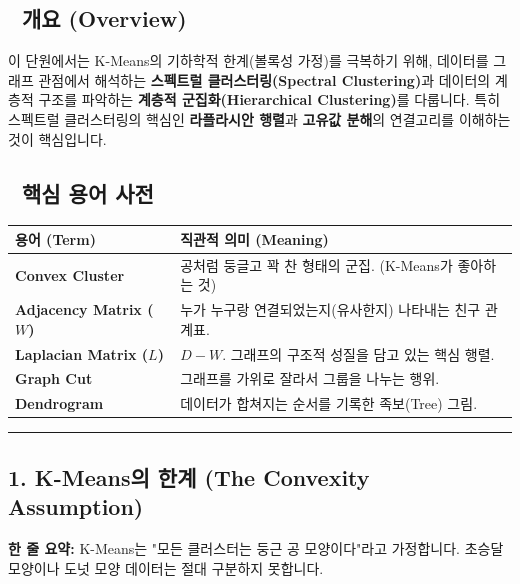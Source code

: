 \documentclass[11pt,a4paper]{book}
\theoremstyle{definition}
\begin{document}
\subsection*{📌 개요 (Overview)}
이 단원에서는 K-Means의 기하학적 한계(볼록성 가정)를 극복하기 위해, 데이터를 그래프 관점에서 해석하는 \textbf{스펙트럴 클러스터링(Spectral Clustering)}과 데이터의 계층적 구조를 파악하는 \textbf{계층적 군집화(Hierarchical Clustering)}를 다룹니다. 특히 스펙트럴 클러스터링의 핵심인 \textbf{라플라시안 행렬}과 \textbf{고유값 분해}의 연결고리를 이해하는 것이 핵심입니다.

\subsection*{📝 핵심 용어 사전}
\begin{table}[h]
\centering
\begin{tabularx}{\textwidth}{|p{}|X|}
\hline
\textbf{용어 (Term)} & \textbf{직관적 의미 (Meaning)} \\
\hline
\textbf{Convex Cluster} & 공처럼 둥글고 꽉 찬 형태의 군집. (K-Means가 좋아하는 것) \\
\hline
\textbf{Adjacency Matrix ($W$)} & 누가 누구랑 연결되었는지(유사한지) 나타내는 친구 관계표. \\
\hline
\textbf{Laplacian Matrix ($L$)} & $D - W$. 그래프의 구조적 성질을 담고 있는 핵심 행렬. \\
\hline
\textbf{Graph Cut} & 그래프를 가위로 잘라서 그룹을 나누는 행위. \\
\hline
\textbf{Dendrogram} & 데이터가 합쳐지는 순서를 기록한 족보(Tree) 그림. \\
\hline
\end{tabularx}
\end{table}

\vspace{0.5cm}\hrule\vspace{0.5cm}

\subsection{1. K-Means의 한계 (The Convexity Assumption)}


\begin{conceptbox}[title={개념 1: 둥근 구멍에 네모난 못}]
\textbf{한 줄 요약:} K-Means는 "모든 클러스터는 둥근 공 모양이다"라고 가정합니다. 초승달 모양이나 도넛 모양 데이터는 절대 구분하지 못합니다.
\end{conceptbox}
\end{document}

